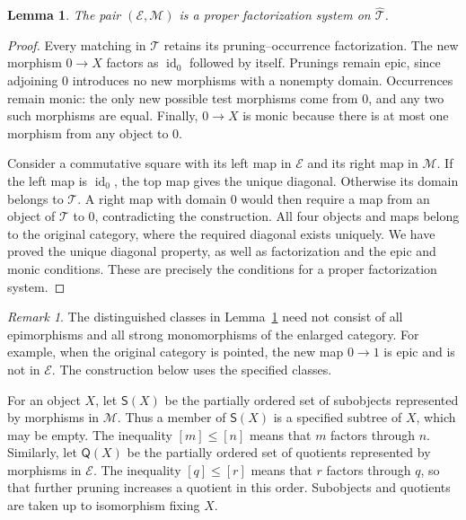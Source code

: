 \documentclass[11pt,a4paper]{article}
\theoremstyle{plain}
\newtheorem{lemma}[theorem]{Lemma}
\theoremstyle{definition}
\theoremstyle{remark}
\newtheorem{remark}[theorem]{Remark}
\newcommand{\id}{\operatorname{id}}
\begin{document}
\begin{lemma}\label{lem:augmented-factorization}
The pair $(\mathcal E,\mathcal M)$ is a proper factorization system
on $\widehat{\mathcal T}$.
\end{lemma}
\begin{proof}
Every matching in $\mathcal T$ retains its pruning--occurrence
factorization. The new morphism $0\to X$ factors as $\id_0$
followed by itself. Prunings remain epic, since adjoining $0$
introduces no new morphisms with a nonempty domain. Occurrences
remain monic: the only new possible test morphisms come from
$0$, and any two such morphisms are equal. Finally, $0\to X$
is monic because there is at most one morphism from any object
to $0$.

Consider a commutative square with its left map in $\mathcal E$
and its right map in $\mathcal M$. If the left map is $\id_0$,
the top map gives the unique diagonal.
Otherwise its domain belongs to $\mathcal T$. A right map with
domain $0$ would then require a map from an object of $\mathcal T$
to $0$, contradicting the construction. All four objects and
maps belong to the original category, where the required diagonal
exists uniquely. We have proved the unique diagonal property,
as well as factorization and the epic and monic conditions.
These are precisely the conditions for a proper factorization system.
\end{proof}

\begin{remark}
The distinguished classes in Lemma~\ref{lem:augmented-factorization}
need not consist of all epimorphisms and all strong monomorphisms
of the enlarged category. For example, when the original category
is pointed, the new map $0\to1$ is epic and is not in
$\mathcal E$. The construction below uses the specified classes.
\end{remark}

\label{not:tree-subobjects-quotients}
For an object $X$, let $\mathsf S(X)$ be the partially ordered
set of subobjects represented by morphisms in $\mathcal M$.
Thus a member of $\mathsf S(X)$ is a specified subtree of
$X$, which may be empty. The inequality $[m]\le[n]$ means
that $m$ factors through $n$. Similarly, let $\mathsf Q(X)$
be the partially ordered set of quotients represented by morphisms
in $\mathcal E$. The inequality $[q]\le[r]$ means that $r$
factors through $q$, so that further pruning increases a quotient
in this order. Subobjects and quotients are taken up to
isomorphism fixing $X$.
\end{document}
